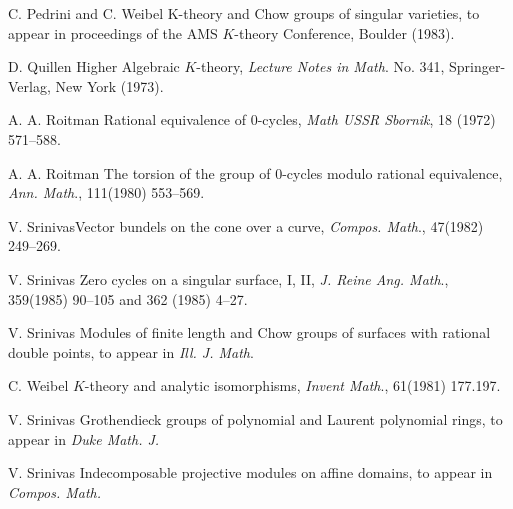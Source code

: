 \begin{thebibliography}{ABCDEFGHI}
{C. Pedrini and C. Weibel} K-theory and Chow groups of singular varieties, to appear in proceedings of the AMS $K$-theory Conference, Boulder (1983). 

{D. Quillen} Higher Algebraic $K$-theory, \textit{Lecture Notes in Math}. No. 341, Springer-Verlag, New York (1973). 

{A. A. Roitman} Rational equivalence of $0$-cycles, \textit{Math USSR Sbornik}, 18 (1972) 571--588. 

{A. A. Roitman} The torsion of the group of $0$-cycles modulo rational equivalence, \textit{Ann. Math}., 111(1980) 553--569.

{V. Srinivas}\pageoriginale Vector bundels on the cone over a curve, \textit{Compos. Math}., 47(1982) 249--269.

{V. Srinivas} Zero cycles on a singular surface, I, II, \textit{J. Reine Ang. Math}., 359(1985) 90--105 and 362 (1985) 4--27.

{V. Srinivas} Modules of finite length and Chow groups of surfaces with rational double points, to appear in \textit{Ill. J. Math}. 

{C. Weibel} $K$-theory and analytic isomorphisms, \textit{Invent Math}., 61(1981) 177.197.

{V. Srinivas} Grothendieck groups of polynomial and Laurent polynomial rings, to appear in \textit{Duke Math. J. }

{V. Srinivas} Indecomposable projective modules on affine domains, to appear in \textit{Compos. Math.}
\end{thebibliography}

